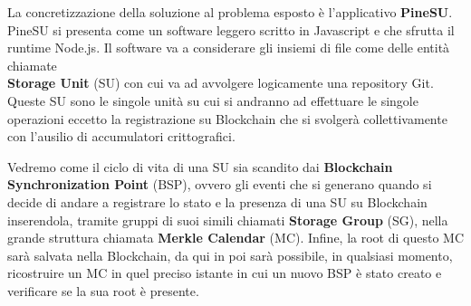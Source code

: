 
La concretizzazione della soluzione al problema esposto è l’applicativo \textbf{PineSU}. \\
PineSU si presenta come un software leggero scritto in Javascript e che sfrutta il runtime Node.js.
Il software va a considerare gli insiemi di file come delle entità chiamate \\
\textbf{Storage Unit} (SU) con cui va ad avvolgere logicamente una repository Git. \\
Queste SU sono le singole unità su cui si andranno ad effettuare le singole
operazioni eccetto la registrazione su Blockchain che si svolgerà collettivamente con l’ausilio di accumulatori crittografici. 

Vedremo come il ciclo di vita di una SU sia scandito dai \textbf{Blockchain Synchronization Point} (BSP),
ovvero gli eventi che si generano quando si decide di andare a registrare lo stato e la presenza di una SU su Blockchain inserendola,
tramite gruppi di suoi simili chiamati \textbf{Storage Group} (SG), nella grande struttura chiamata \textbf{Merkle Calendar} (MC).
Infine, la root di questo MC sarà salvata nella Blockchain, da qui in poi sarà possibile, in qualsiasi momento, ricostruire un MC in quel preciso istante in cui un nuovo BSP è stato creato e verificare se la sua root è presente.

